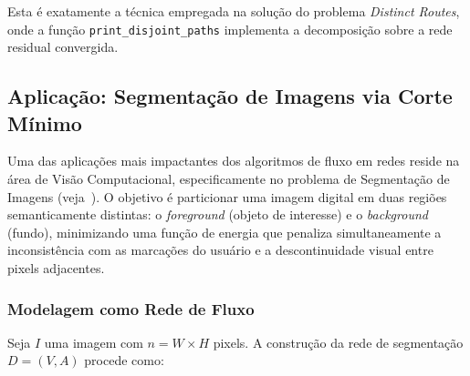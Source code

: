 \documentclass[12pt,a4paper]{article}
\begin{document}
Esta é exatamente a técnica empregada na solução do problema \textit{Distinct Routes}, onde a função \lstinline{print_disjoint_paths} implementa a decomposição sobre a rede residual convergida.

\subsection{Aplicação: Segmentação de Imagens via Corte Mínimo}

Uma das aplicações mais impactantes dos algoritmos de fluxo em redes reside na área de Visão Computacional, especificamente no problema de Segmentação de Imagens (veja~\cite{ford1956maximal, cook1998combinatorial}). O objetivo é particionar uma imagem digital em duas regiões semanticamente distintas: o \textit{foreground} (objeto de interesse) e o \textit{background} (fundo), minimizando uma função de energia que penaliza simultaneamente a inconsistência com as marcações do usuário e a descontinuidade visual entre pixels adjacentes.

\subsubsection{Modelagem como Rede de Fluxo}

Seja $I$ uma imagem com $n = W \times H$ pixels. A construção da rede de segmentação $D = (V, A)$ procede como:
\end{document}
